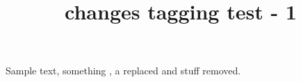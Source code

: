 \documentclass{article}
\title{changes tagging test - 1}
\begin{document}
Sample text, something ,
a  replaced and
 stuff
removed. 
\listofchanges
\end{document}
